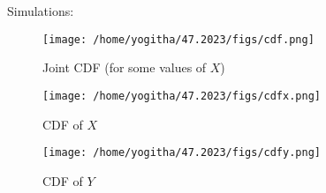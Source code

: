 \documentclass[journal,12pt,twocolumn]{IEEEtran}
\theoremstyle{remark}
\begin{document}
Simulations:
\begin{figure}[H]
  \centering
  \texttt{[image: /home/yogitha/47.2023/figs/cdf.png]}
  \caption{Joint CDF (for some values of $X$)}
  \label{fig:joint_cdf}
\end{figure}
\begin{figure}[H]
  \centering
  \texttt{[image: /home/yogitha/47.2023/figs/cdfx.png]}
  \caption{CDF of $X$}
  \label{fig:cdf_x}
\end{figure}
\begin{figure}[H]
  \centering
  \texttt{[image: /home/yogitha/47.2023/figs/cdfy.png]}
  \caption{CDF of $Y$}
  \label{fig:cdf_y}
\end{figure}
\end{document}
